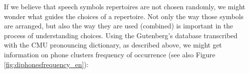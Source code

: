 


If we believe that speech symbols repertoires are not chosen randomly, 
we might wonder what guides the choices of a repertoire. 
Not only the way those symbols are arranged, but also the way they are used (combined) 
is important in the process of understanding choices. 
Using the Gutenberg's database transcribed with the CMU pronouncing dictionary, as described above, we might get information 
on phone clusters frequency of occurrence (see also Figure \ref{fig:diphonesfrequency_en}):

